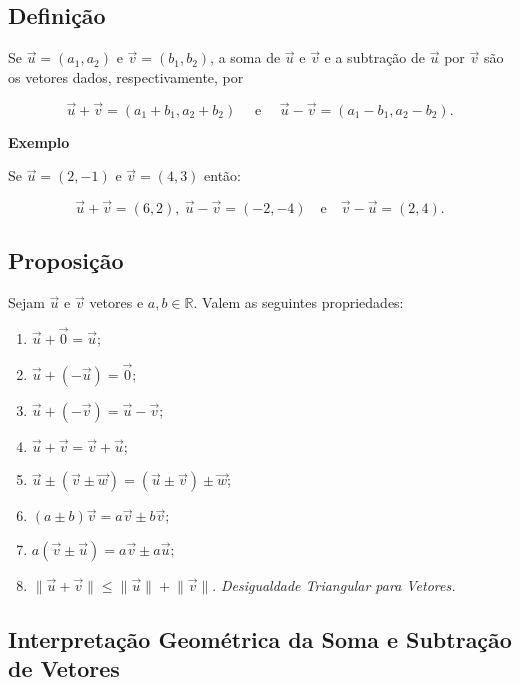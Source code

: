 \documentclass[
  brazilian,
  letterpaper,
  DIV=11,
  numbers=noendperiod]{scrreprt}
\providecommand{\tightlist}{%
  \setlength{\itemsep}{0pt}\setlength{\parskip}{0pt}}
\theoremstyle{definition}
\theoremstyle{plain}
\theoremstyle{definition}
\theoremstyle{remark}
\begin{document}
\subsection{Definição}\label{definiuxe7uxe3o-5}

Se \(\vec{u}=(a_1,a_2)\) e \(\vec{v}=(b_1,b_2)\), a soma de \(\vec{u}\)
e \(\vec{v}\) e a subtração de \(\vec{u}\) por \(\vec{v}\) são os
vetores dados, respectivamente, por

\[
 \vec{u}+\vec{v}=(a_1+b_1,a_2+b_2)    \quad \text{ e } \quad  \vec{u}-\vec{v}=(a_1-b_1,a_2-b_2).
\]

\textbf{Exemplo}

Se \(\vec{u}=(2,-1)\) e \(\vec{v}=(4,3)\) então:

\[
\vec{u}+\vec{v}=(6,2), \ \vec{u}-\vec{v}=(-2,-4)  \quad \text{e} \quad   \vec{v}-\vec{u}=(2,4).
\]

\subsection{Proposição}\label{proposiuxe7uxe3o-6}

Sejam \(\vec{u}\) e \(\vec{v}\) vetores e \(a,b\in\mathbb{R}\). Valem as
seguintes propriedades:

\begin{enumerate}
\def\labelenumi{\arabic{enumi}.}
\tightlist
\item
  \(\vec{u}+\vec{0}=\vec{u}\);
\item
  \(\vec{u}+(-\vec{u})=\vec{0}\);
\item
  \(\vec{u}+(-\vec{v})=\vec{u}-\vec{v}\);
\item
  \(\vec{u}+\vec{v}=\vec{v}+\vec{u}\);
\item
  \(\vec{u}\pm(\vec{v}\pm\vec{w})=(\vec{u}\pm\vec{v})\pm\vec{w}\);
\item
  \((a\pm b)\vec{v}=a\vec{v}\pm b\vec{v}\);
\item
  \(a(\vec{v}\pm\vec{u})=a\vec{v}\pm a\vec{u};\)
\item
  \(\lVert \vec{u} + \vec{v} \rVert \leq \lVert \vec{u} \rVert + \lVert \vec{v} \rVert.\)
  \emph{Desigualdade Triangular para Vetores.}
\end{enumerate}

\subsection{Interpretação Geométrica da Soma e Subtração de
Vetores}\label{interpretauxe7uxe3o-geomuxe9trica-da-soma-e-subtrauxe7uxe3o-de-vetores}
\end{document}
